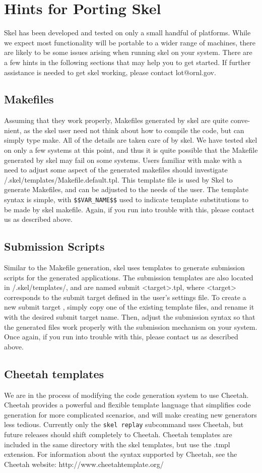 
\chapter{Hints for Porting Skel}
Skel has been developed and tested on only a small handful of platforms. While
we expect most functionality will be portable to a wider range of machines,
there are likely to be some issues arising when running skel on your system.
There are a few hints in the following sections that may help you to get started.
If further assistance is needed to get skel working, please contact lot@ornl.gov.

\section{Makefiles}
Assuming that they work properly, Makefiles generated by skel are quite conve-
nient, as the skel user need not think about how to compile the code, but can
simply type make. All of the details are taken care of by skel. We have tested
skel on only a few systems at this point, and thus it is quite possible that the
Makefile generated by skel may fail on some systems. Users familiar with make
with a need to adjust some aspect of the generated makefiles should investigate
/.skel/templates/Makefile.default.tpl. This template file is used by Skel to
generate Makefiles, and can be adjusted to the needs of the user. The template
syntax is simple, with {\tt \$\$VAR\_NAME\$\$} used to indicate template substitutions
to be made by skel makefile. Again, if you run into trouble with this, please
contact us as described above.

\section{Submission Scripts}
Similar to the Makefile generation, skel uses templates to generate submission
scripts for the generated applications. The submission templates are also located
in
/.skel/templates/, and are named submit <target>.tpl, where <target>
corresponds to the submit target defined in the user's settings file. To create a
new submit target , simply copy one of the existing template files, and rename
it with the desired submit target name. Then, adjust the submission syntax
so that the generated files work properly with the submission mechanism on
your system. Once again, if you run into trouble with this, please contact us as
described above.

\section{Cheetah templates}
We are in the process of modifying the code generation system to use Cheetah. Cheetah
provides a powerful and flexible template language that simplifies code generation for more
complicated scenarios, and will make creating new generators less tedious. Currently only
the {\tt skel replay} subcommand uses Cheetah, but future releases should shift completely
to Cheetah. Cheetah templates are included in the same directory with the skel templates,
but use the .tmpl extension. For information about the syntax supported by Cheetah, see the
Cheetah website: http://www.cheetahtemplate.org/



